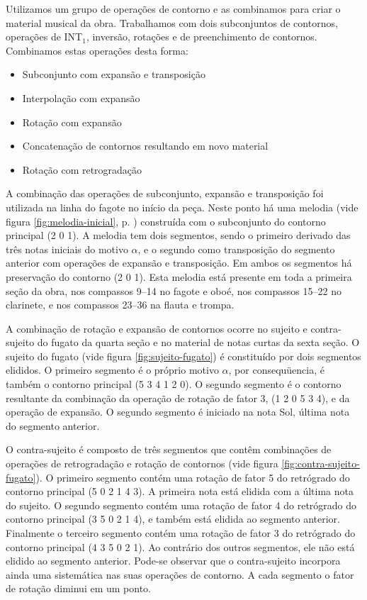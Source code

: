 Utilizamos um grupo de operações de contorno e as combinamos para
criar o material musical da obra. Trabalhamos com dois subconjuntos de
contornos, operações de INT$_1$, inversão, rotações e de preenchimento
de contornos. Combinamos estas operações desta forma:

\begin{itemize}
\item Subconjunto com expansão e transposição
\item Interpolação com expansão
\item Rotação com expansão
\item Concatenação de contornos resultando em novo material
\item Rotação com retrogradação
\end{itemize}

A combinação das operações de subconjunto, expansão e transposição foi
utilizada na linha do fagote no início da peça. Neste ponto há uma
melodia (vide figura \ref{fig:melodia-inicial},
p. \pageref{fig:melodia-inicial}) construída com o subconjunto do
contorno principal (2 0 1). A melodia tem dois segmentos, sendo o
primeiro derivado das três notas iniciais do motivo $\alpha$, e o
segundo como transposição do segmento anterior com operações de
expansão e transposição. Em ambos os segmentos há preservação do
contorno (2 0 1). Esta melodia está presente em toda a primeira seção
da obra, nos compassos 9--14 no fagote e oboé, nos compassos 15--22 no
clarinete, e nos compassos 23--36 na flauta e trompa.

A combinação de rotação e expansão de contornos ocorre no sujeito e
contra-sujeito do fugato da quarta seção e no material de notas curtas
da sexta seção. O sujeito do fugato (vide figura
\ref{fig:sujeito-fugato}) é constituído por dois segmentos elididos. O
primeiro segmento é o próprio motivo $\alpha$, por consequüencia, é
também o contorno principal (5 3 4 1 2 0). O segundo segmento é o
contorno resultante da combinação da operação de rotação de fator 3,
(1 2 0 5 3 4), e da operação de expansão. O segundo segmento é
iniciado na nota Sol, última nota do segmento anterior.

O contra-sujeito é composto de três segmentos que contêm combinações
de operações de retrogradação e rotação de contornos (vide figura
\ref{fig:contra-sujeito-fugato}). O primeiro segmento contém uma
rotação de fator 5 do retrógrado do contorno principal (5 0 2 1 4
3). A primeira nota está elidida com a última nota do sujeito. O
segundo segmento contém uma rotação de fator 4 do retrógrado do
contorno principal (3 5 0 2 1 4), e também está elidida ao segmento
anterior. Finalmente o terceiro segmento contém uma rotação de fator 3
do retrógrado do contorno principal (4 3 5 0 2 1). Ao contrário dos
outros segmentos, ele não está elidido ao segmento anterior. Pode-se
observar que o contra-sujeito incorpora ainda uma sistemática nas suas
operações de contorno. A cada segmento o fator de rotação diminui em
um ponto.

